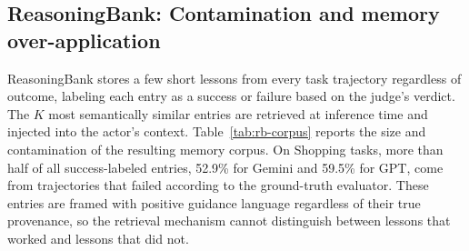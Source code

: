 \begin{table}[ht]
\centering
{}
\caption{\textbf{AWM workflow-induction statistics} on WebArena, averaged per run. \emph{Induced}: total induction events triggered by the judge for a run. \emph{From failed (\%)}: fraction originating from tasks the ground-truth evaluator classified as failed. \emph{Final WFs}: distinct workflows in the final library after duplicate suppression.}
\label{tab:awm-induction}
\end{table}

\subsection{ReasoningBank: Contamination and memory over-application}
\label{app:rb-failures}

ReasoningBank stores a few short lessons from every task trajectory regardless of outcome, labeling each entry as a success or failure based on the judge's verdict.
The $K$ most semantically similar entries are retrieved at inference time and injected into the actor's context.
Table~\ref{tab:rb-corpus} reports the size and contamination of the resulting memory corpus.
On Shopping tasks, more than half of all success-labeled entries, 52.9\% for Gemini and 59.5\% for GPT, come from trajectories that failed according to the ground-truth evaluator.
These entries are framed with positive guidance language regardless of their true provenance, so the retrieval mechanism cannot distinguish between lessons that worked and lessons that did not.

